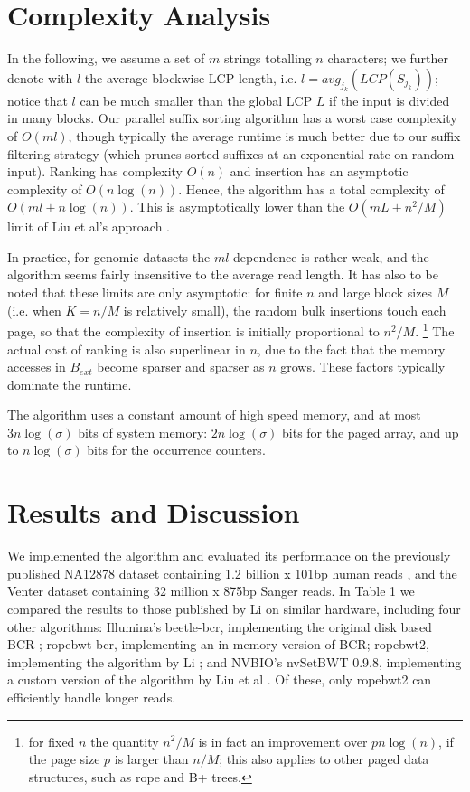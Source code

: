 \documentclass{acmsiggraph}
\begin{document}
\section{Complexity Analysis}

In the following, we assume a set of $m$ strings totalling $n$ characters; we further denote with $l$ the average blockwise LCP length, i.e. $l = avg_{j_k}(LCP(S_{j_k}))$; notice that $l$ can be much smaller than the global LCP $L$ if the input is divided in many blocks.
Our parallel suffix sorting algorithm has a worst case complexity of $O(m l)$, though typically the average runtime is much better due to our suffix filtering strategy (which prunes sorted suffixes at an exponential rate on random input).
Ranking has complexity $O(n)$ and insertion has an asymptotic complexity of $O(n \log(n))$.
Hence, the algorithm has a total complexity of $O( m l + n \log(n) )$.
This is asymptotically lower than the $O( m L + n^2/M )$ limit of Liu et al's approach .

In practice, for genomic datasets the $ml$ dependence is rather weak, and the algorithm seems fairly insensitive to the average read length.
It has also to be noted that these limits are only asymptotic: for finite $n$ and large block sizes $M$ (i.e. when $K = n / M$ is relatively small), the random bulk insertions touch each page, so that the complexity of insertion is initially proportional to $n^2 / M$. \footnote{for fixed $n$ the quantity $n^2/M$ is in fact an improvement over $p n \log(n)$, if the page size $p$ is larger than $n/M$; this also applies to other paged data structures, such as rope and B+ trees.} The actual cost of ranking is also superlinear in $n$, due to the fact that the memory accesses in $B_{ext}$ become sparser and sparser as $n$ grows. These factors typically dominate the runtime.

The algorithm uses a constant amount of high speed memory, and at most $3n \log(\sigma)$ bits of system memory: $2n \log(\sigma)$ bits for the paged array,
and up to $n\log(\sigma)$ bits for the occurrence counters.

\section{Results and Discussion}

We implemented the algorithm and evaluated its performance on the previously published NA12878 dataset containing 1.2 billion x 101bp human reads \cite{Depristo:2011}, and the Venter dataset containing 32 million x 875bp Sanger reads.
In Table 1 we compared the results to those published by Li  on similar hardware, including four other algorithms: Illumina's beetle-bcr,
implementing the original disk based BCR \cite{Bauer:2011}; ropebwt-bcr, implementing an in-memory version of BCR; ropebwt2, implementing the algorithm by Li ; and NVBIO's nvSetBWT 0.9.8, implementing a custom version of the algorithm by Liu et al . Of these, only ropebwt2 can efficiently handle longer reads.
\end{document}
